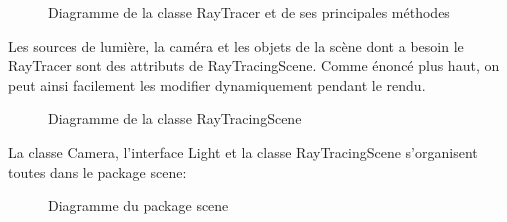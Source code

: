 \documentclass[11pt]{article}
\begin{document}
\begin{figure}[h!]
	
	\caption{Diagramme de la classe RayTracer et de ses principales méthodes}
	\label{diagrammeRayTracer}
\end{figure}
\FloatBarrier

Les sources de lumière, la caméra et les objets de la scène dont a besoin le RayTracer sont des attributs de RayTracingScene. Comme énoncé plus haut, on peut ainsi facilement les modifier dynamiquement pendant le rendu.

\begin{figure}[h!]
	
	\caption{Diagramme de la classe RayTracingScene}
	\label{diagrammeRayTracingScene}
\end{figure}
\FloatBarrier

La classe Camera, l'interface Light et la classe RayTracingScene s'organisent toutes dans le package scene:

\begin{figure}[h!]
	
	\caption{Diagramme du package scene}
	\label{diagrammePackageScene}
\end{figure}
\FloatBarrier
\end{document}
